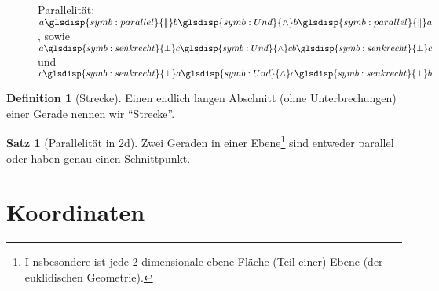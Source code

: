 \documentclass[a4paper]{book}%
\theoremstyle{definition}
\newtheorem{definition}{Definition}
\newtheorem{satz}{Satz}
\begin{document}
\begin{figure}
  \centering
    $\quad$

  \caption{Parallelität: $a \glsdisp{symb:parallel}{\|} b \glsdisp{symb:Und}{\wedge} b \glsdisp{symb:parallel}{\|} a$, sowie $a \glsdisp{symb:senkrecht}{\bot} c \glsdisp{symb:Und}{\wedge} c b \glsdisp{symb:senkrecht}{\bot} c$ und $c \glsdisp{symb:senkrecht}{\bot} a \glsdisp{symb:Und}{\wedge} c \glsdisp{symb:senkrecht}{\bot} b$}\label{fig:Parallelitaet}
\end{figure}



\begin{definition}[Strecke]\label{def:Strecke}
    Einen endlich langen Abschnitt (ohne Unterbrechungen) einer Gerade nennen wir \enquote{Strecke}.
\end{definition}

\begin{satz}[Parallelität in 2d]\label{def:Parallele}
    Zwei Geraden in einer Ebene\footnote{I-nsbesondere ist jede 2-dimensionale ebene Fläche (Teil einer) Ebene (der euklidischen Geometrie).} sind entweder parallel oder haben genau einen Schnittpunkt.
\end{satz}


\section{Koordinaten}\label{Koordinaten}
\end{document}
